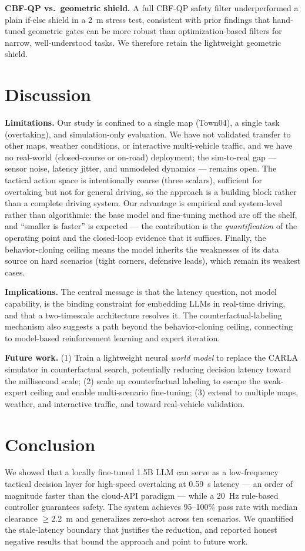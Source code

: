 \documentclass[conference]{IEEEtran}
\begin{document}
\textbf{CBF-QP vs.\ geometric shield.} A full CBF-QP safety filter
underperformed a plain if-else shield in a 2~m stress test, consistent with
prior findings that hand-tuned geometric gates can be more robust than
optimization-based filters for narrow, well-understood tasks. We therefore
retain the lightweight geometric shield.

\section{Discussion}
\textbf{Limitations.} Our study is confined to a single map (Town04), a single
task (overtaking), and simulation-only evaluation. We have not validated
transfer to other maps, weather conditions, or interactive multi-vehicle
traffic, and we have no real-world (closed-course or on-road) deployment; the
sim-to-real gap --- sensor noise, latency jitter, and unmodeled dynamics ---
remains open. The tactical action space is intentionally coarse (three
scalars), sufficient for overtaking but not for general driving, so the approach
is a building block rather than a complete driving system. Our advantage is
empirical and system-level rather than algorithmic: the base model and
fine-tuning method are off the shelf, and ``smaller is faster'' is expected ---
the contribution is the \emph{quantification} of the operating point and the
closed-loop evidence that it suffices. Finally, the behavior-cloning ceiling
means the model inherits the weaknesses of its data source on hard scenarios
(tight corners, defensive leads), which remain its weakest cases.

\textbf{Implications.} The central message is that the latency question, not
model capability, is the binding constraint for embedding LLMs in real-time
driving, and that a two-timescale architecture resolves it. The
counterfactual-labeling mechanism also suggests a path beyond the
behavior-cloning ceiling, connecting to model-based reinforcement learning and
expert iteration.

\textbf{Future work.} (1) Train a lightweight neural \emph{world model} to
replace the CARLA simulator in counterfactual search, potentially reducing
decision latency toward the millisecond scale; (2) scale up counterfactual
labeling to escape the weak-expert ceiling and enable multi-scenario
fine-tuning; (3) extend to multiple maps, weather, and interactive traffic, and
toward real-vehicle validation.

\section{Conclusion}
We showed that a locally fine-tuned 1.5B LLM can serve as a low-frequency
tactical decision layer for high-speed overtaking at 0.59~s latency --- an order
of magnitude faster than the cloud-API paradigm --- while a 20~Hz rule-based
controller guarantees safety. The system achieves 95--100\% pass rate with
median clearance $\geq$2.2~m and generalizes zero-shot across ten scenarios. We
quantified the stale-latency boundary that justifies the reduction, and reported
honest negative results that bound the approach and point to future work.
\end{document}
